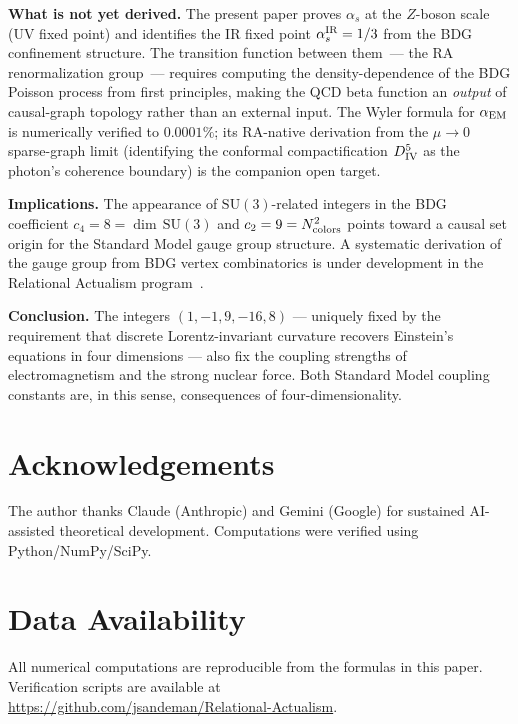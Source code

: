 \documentclass[12pt,a4paper]{article}
\theoremstyle{definition}
\begin{document}
\medskip

\noindent\textbf{What is not yet derived.}  The present paper proves
$\alpha_s$ at the $Z$-boson scale (UV fixed point) and identifies the IR
fixed point $\alpha_s^{\rm IR}=1/3$ from the BDG confinement structure.
The transition function between them~--- the RA renormalization group~---
requires computing the density-dependence of the BDG Poisson process from
first principles, making the QCD beta function an \emph{output} of
causal-graph topology rather than an external input.  The Wyler formula
for $\alpha_{\rm EM}$ is numerically verified to $0.0001\%$; its
RA-native derivation from the $\mu\to 0$ sparse-graph limit (identifying
the conformal compactification $D_{\rm IV}^5$ as the photon's coherence
boundary) is the companion open target.

\medskip

\noindent\textbf{Implications.}  The appearance of $\mathrm{SU}(3)$-related
integers in the BDG coefficient $c_4 = 8 = \dim\,\mathrm{SU}(3)$ and
$c_2 = 9 = N_{\rm colors}^2$ points toward a causal set origin for the
Standard Model gauge group structure.  A systematic derivation of the gauge
group from BDG vertex combinatorics is under development in the Relational
Actualism program~\cite{Sandeman2025RASM}.

\medskip

\noindent\textbf{Conclusion.}  The integers $(1,-1,9,-16,8)$ — uniquely
fixed by the requirement that discrete Lorentz-invariant curvature recovers
Einstein's equations in four dimensions — also fix the coupling strengths
of electromagnetism and the strong nuclear force.  Both Standard Model
coupling constants are, in this sense, consequences of four-dimensionality.

\section*{Acknowledgements}
The author thanks Claude (Anthropic) and Gemini (Google) for sustained
AI-assisted theoretical development.  Computations were verified using
Python/NumPy/SciPy.

\section*{Data Availability}
All numerical computations are reproducible from the formulas in this
paper.  Verification scripts are available at\\
\url{https://github.com/jsandeman/Relational-Actualism}.
\end{document}
